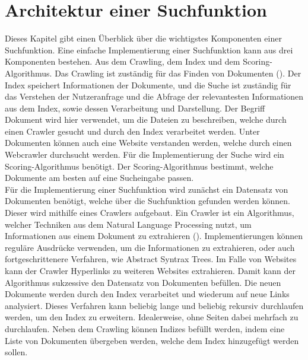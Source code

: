 \section{Architektur einer Suchfunktion}
Dieses Kapitel gibt einen Überblick über die wichtigstes Komponenten einer Suchfunktion.
Eine einfache Implementierung einer Suchfunktion kann aus drei Komponenten bestehen.
Aus dem Crawling, dem Index und dem Scoring-Algorithmus.
Das Crawling ist zuständig für das Finden von Dokumenten (\cite{Castillo_2005}).
Der Index speichert Informationen der Dokumente, und die Suche ist zuständig für das Verstehen der Nutzeranfrage und die Abfrage der relevantesten Informationen aus dem Index, sowie dessen Verarbeitung und Darstellung.
Der Begriff Dokument wird hier verwendet, um die Dateien zu beschreiben, welche durch einen Crawler gesucht und durch den Index verarbeitet werden.
Unter Dokumenten können auch eine Website verstanden werden, welche durch einen Webcrawler durchsucht werden.
Für die Implementierung der Suche wird ein Scoring-Algorithmus benötigt.
Der Scoring-Algorithmus bestimmt, welche Dokumente am besten auf eine Sucheingabe passen.\\

Für die Implementierung einer Suchfunktion wird zunächst ein Datensatz von Dokumenten benötigt, welche über die Suchfunktion gefunden werden können.
Dieser wird mithilfe eines Crawlers aufgebaut.
Ein Crawler ist ein Algorithmus, welcher Techniken aus dem Natural Language Processing nutzt, um Informationen aus einem Dokument zu extrahieren (\cite{Khder_2021}).
Implementierungen können reguläre Ausdrücke verwenden, um die Informationen zu extrahieren, oder auch fortgeschrittenere Verfahren, wie Abstract Syntrax Trees.
Im Falle von Websites kann der Crawler Hyperlinks zu weiteren Websites extrahieren.
Damit kann der Algorithmus sukzessive den Datensatz von Dokumenten befüllen.
Die neuen Dokumente werden durch den Index verarbeitet und wiederum auf neue Links analysiert.
Dieses Verfahren kann beliebig lange und beliebig rekursiv durchlaufen werden, um den Index zu erweitern.
Idealerweise, ohne Seiten dabei mehrfach zu durchlaufen.
Neben dem Crawling können Indizes befüllt werden, indem eine Liste von Dokumenten übergeben werden, welche dem Index hinzugefügt werden sollen.\\

